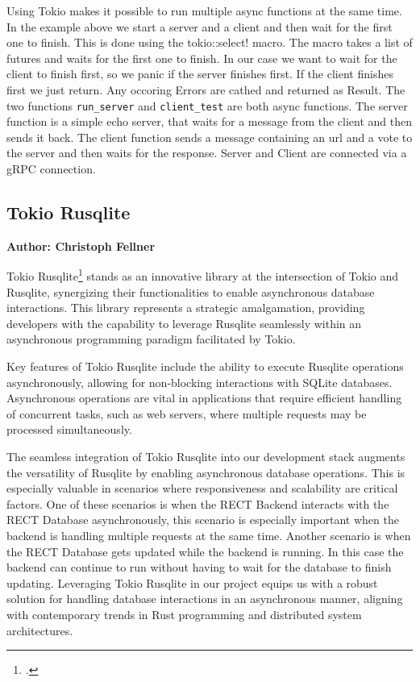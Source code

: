 Using Tokio makes it possible to run multiple async functions at the same time. In the example above we start a server and a client and then wait for the first one to finish. 
This is done using the tokio::select! macro. The macro takes a list of futures and waits for the first one to finish. In our case we want to wait for the client to finish 
first, so we panic if the server finishes first. If the client finishes first we just return. Any occoring Errors are cathed and returned as Result.
The two functions \verb+run_server+ and \verb+client_test+ are both async functions. The server function is a simple echo server, that waits for a message from the client and 
then sends it back. The client function sends a message containing an url and a vote to the server and then waits for the response. Server and Client are connected via a gRPC 
connection. 

\subsection{Tokio Rusqlite}
\textbf{Author: Christoph Fellner}

Tokio Rusqlite\footcite{tokiolite} stands as an innovative library at the intersection of Tokio and Rusqlite, synergizing their functionalities to enable 
asynchronous database interactions. This library represents a strategic amalgamation, providing developers with the capability to leverage Rusqlite seamlessly 
within an asynchronous programming paradigm facilitated by Tokio.\newline

Key features of Tokio Rusqlite include the ability to execute Rusqlite operations asynchronously, allowing for non-blocking interactions with SQLite databases. 
Asynchronous operations are vital in applications that require efficient handling of concurrent tasks, such as web servers, where multiple requests may be 
processed simultaneously.\newline

The seamless integration of Tokio Rusqlite into our development stack augments the versatility of Rusqlite by enabling asynchronous database operations. This is 
especially valuable in scenarios where responsiveness and scalability are critical factors. One of these scenarios is when the RECT Backend interacts with the RECT Database 
asynchronously, this scenario is especially important when the backend is handling multiple requests at the same time. Another scenario is when the RECT Database gets updated
while the backend is running. In this case the backend can continue to run without having to wait for the database to finish updating. Leveraging Tokio Rusqlite in our project 
equips us with a robust solution for handling database interactions in an asynchronous manner, aligning with contemporary trends in Rust programming and distributed system 
architectures.

